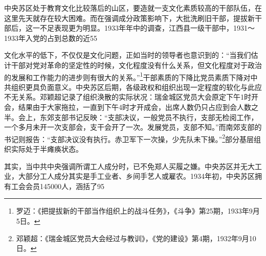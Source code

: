 中央苏区处于教育文化比较落后的山区，要造就一支文化素质较高的干部队伍，在这里先天就存在较大困难。而在强调成分政策影响下，大批洗刷旧干部，提拔新干部后，这一不足表现更为明显。1933年年中的调查，江西县一级干部中，1931～1933年入党的占到总数的近55%


文化水平的低下，不仅仅是文化问题，正如当时的领导者也意识到的：“当我们估计干部对党对革命的坚定性的时候，文化程度没有什么关系，但文化程度对于政治的发展和工作能力的进步则有很大的关系。”\footnote{罗迈：《把提拔新的干部当作组织上的战斗任务》，《斗争》第25期，1933年9月5日。}干部素质的下降比党员素质下降对中共组织更具负面意义。中央苏区后期，各级政权和组织出现一定程度的软化与此应不无关系。邓颖超记录了组织涣散的实际状况：瑞金城区党员大会原定下午1时开会，结果由于大家拖拉，一直到下午4时才开成会，出席人数仍只占应到会人数之半。会上，东郊支部书记反映：“支部决议，一般党员不执行，支部无检阅工作，一个多月未开一次支部会，支干会开了一次。发展党员，支部不知。”而南郊支部的书记则报告：“支部决议没有执行。赤卫军下一次操，少先队未下操。”\footnote{邓颖超：《瑞金城区党员大会经过与教训》，《党的建设》第4期，1932年9月10日。}部分基层组织实际处于半瘫痪状态。


其实，当中共中央强调所谓工人成分时，已不免郑人买履之嫌。中央苏区并无大工业，大部分工人成分其实是手工业者、乡间手艺人或雇农。1934年初，中央苏区拥有工会会员145000人，涵括了95%

